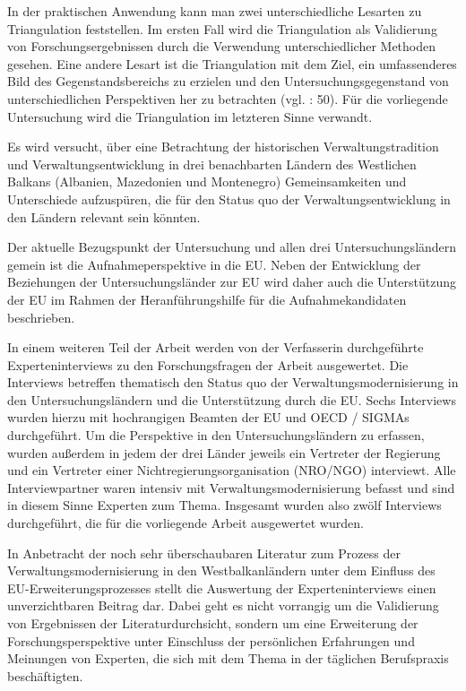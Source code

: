 In der praktischen Anwendung kann man zwei unterschiedliche Lesarten zu Triangulation feststellen. Im ersten Fall wird die Triangulation als Validierung von Forschungsergebnissen durch die Verwendung unterschiedlicher Methoden gesehen. Eine andere Lesart ist die Triangulation mit dem Ziel, ein umfassenderes Bild des Gegenstandsbereichs zu erzielen und den Untersuchungsgegenstand von unterschiedlichen Perspektiven her zu betrachten (vgl. \cite{kelle}: 50). Für die vorliegende Untersuchung wird die Triangulation im letzteren Sinne verwandt.
\par
Es wird versucht, über eine Betrachtung der historischen Verwaltungstradition und Verwaltungsentwicklung in drei benachbarten Ländern des Westlichen Balkans (Albanien, Mazedonien und Montenegro) Gemeinsamkeiten und Unterschiede aufzuspüren, die für den Status quo der Verwaltungsentwicklung in den Ländern relevant sein könnten.\par
Der aktuelle Bezugspunkt der Untersuchung und allen drei Untersuchungsländern gemein ist die Aufnahmeperspektive in die EU. Neben der Entwicklung der Beziehungen der Untersuchungsländer zur EU wird daher auch die Unterstützung der EU im Rahmen der Heranführungshilfe für die Aufnahmekandidaten beschrieben.\par
In einem weiteren Teil der Arbeit werden von der Verfasserin durchgeführte Experteninterviews zu den Forschungsfragen der Arbeit ausgewertet. Die Interviews betreffen thematisch den Status quo der Verwaltungsmodernisierung in den Untersuchungsländern und die Unterstützung durch die EU. Sechs Interviews wurden hierzu mit hochrangigen Beamten der EU und OECD / SIGMAs durchgeführt. Um die Perspektive in den Untersuchungsländern zu erfassen, wurden außerdem in jedem der drei Länder jeweils ein Vertreter der Regierung und ein Vertreter einer Nichtregierungsorganisation (NRO/NGO) interviewt. Alle Interviewpartner waren intensiv mit Verwaltungsmodernisierung befasst und sind in diesem Sinne Experten zum Thema. Insgesamt wurden also zwölf Interviews durchgeführt, die für die vorliegende Arbeit ausgewertet wurden.
\par
In Anbetracht der noch sehr überschaubaren Literatur zum Prozess der Verwaltungsmodernisierung in den Westbalkanländern unter dem Einfluss des EU-Erweiterungsprozesses stellt die Auswertung der Experteninterviews einen unverzichtbaren Beitrag dar. Dabei geht es nicht vorrangig um die Validierung von Ergebnissen der Literaturdurchsicht, sondern um eine Erweiterung der Forschungsperspektive unter Einschluss der persönlichen Erfahrungen und Meinungen von Experten, die sich mit dem Thema in der täglichen Berufspraxis beschäftigten.\par

